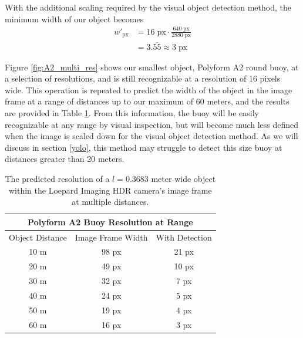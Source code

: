 \documentclass[../main.tex]{subfiles}
\begin{document}
With the additional scaling required by the visual object detection method, the minimum width of our object becomes 
\begin{equation*}
\begin{split}
    \mathit{w}'_{\text{px}} & = 16\;\text{px} \cdot \frac{640\;\text{px}}{2880\;\text{px}} \\
     & = 3.\overline{55} \approx 3 \;\text{px}
\end{split}
\end{equation*}

Figure \ref{fig:A2_multi_res} shows our smallest object, Polyform A2 round buoy, at a selection of resolutions, and is still recognizable at a resolution of 16 pixels wide. %
This operation is repeated to predict the width of the object in the image frame at a range of distances up to our maximum of 60 meters, and the results are provided in Table \ref{table:buoy_res}.
From this information, the buoy will be easily recognizable at any range by visual inspection, but will become much less defined when the image is scaled down for the visual object detection method.
As we will discuss in section \ref{yolo}, this method may struggle to detect this size buoy at distances greater than 20 meters.

\begin{table}[htpb]
\centering
\begin{tabular}{c|c|c}
\hline
\multicolumn{3}{c}{Polyform A2 Buoy Resolution at Range}\\
\hline
\hline
Object Distance & Image Frame Width & With Detection \\
\hline
10 m & 98 px & 21 px \\
20 m & 49 px & 10 px \\
30 m & 32 px & 7 px \\
40 m & 24 px & 5 px \\
50 m & 19 px & 4 px \\
60 m & 16 px & 3 px \\
\hline
\end{tabular}
\caption{The predicted resolution of a $\mathit{l} = 0.3683$ meter wide object within the Loepard Imaging HDR camera's image frame at multiple distances.}
\label{table:buoy_res}
\end{table}
\end{document}
